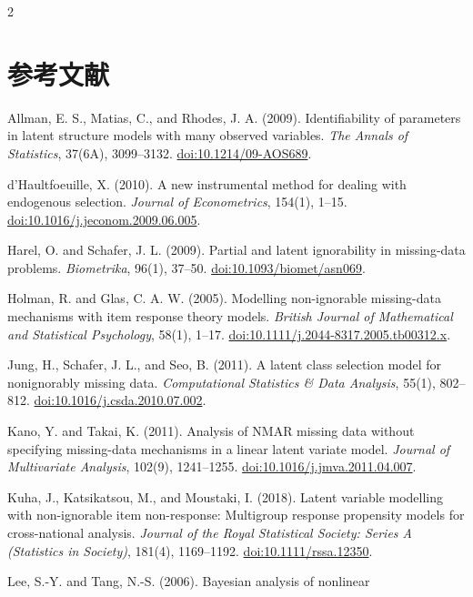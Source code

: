 \documentclass[a4paper,10pt]{article}
\begin{document}
\begin{multicols}{2}
\section*{参考文献}
\begin{enumerate}[label={[\arabic*]},leftmargin=7mm,itemsep=0.35em,topsep=0.2em,
  parsep=0pt,partopsep=0pt]
\item Allman, E. S., Matias, C., and Rhodes, J. A. (2009). Identifiability of
parameters in latent structure models with many observed variables.
\textit{The Annals of Statistics}, 37(6A), 3099--3132.
\href{https://doi.org/10.1214/09-AOS689}{doi:10.1214/09-AOS689}.
\item d'Haultfoeuille, X. (2010). A new instrumental method for dealing with
endogenous selection. \textit{Journal of Econometrics}, 154(1), 1--15.
\href{https://doi.org/10.1016/j.jeconom.2009.06.005}{doi:10.1016/j.jeconom.2009.06.005}.
\item Harel, O. and Schafer, J. L. (2009). Partial and latent ignorability in
missing-data problems. \textit{Biometrika}, 96(1), 37--50.
\href{https://doi.org/10.1093/biomet/asn069}{doi:10.1093/biomet/asn069}.
\item Holman, R. and Glas, C. A. W. (2005). Modelling non-ignorable
missing-data mechanisms with item response theory models. \textit{British
Journal of Mathematical and Statistical Psychology}, 58(1), 1--17.
\href{https://doi.org/10.1111/j.2044-8317.2005.tb00312.x}{doi:10.1111/j.2044-8317.2005.tb00312.x}.
\item Jung, H., Schafer, J. L., and Seo, B. (2011). A latent class selection
model for nonignorably missing data. \textit{Computational Statistics \& Data
Analysis}, 55(1), 802--812.
\href{https://doi.org/10.1016/j.csda.2010.07.002}{doi:10.1016/j.csda.2010.07.002}.
\item Kano, Y. and Takai, K. (2011). Analysis of NMAR missing data without
specifying missing-data mechanisms in a linear latent variate model.
\textit{Journal of Multivariate Analysis}, 102(9), 1241--1255.
\href{https://doi.org/10.1016/j.jmva.2011.04.007}{doi:10.1016/j.jmva.2011.04.007}.
\item Kuha, J., Katsikatsou, M., and Moustaki, I. (2018). Latent variable
modelling with non-ignorable item non-response: Multigroup response propensity
models for cross-national analysis. \textit{Journal of the Royal Statistical
Society: Series A (Statistics in Society)}, 181(4), 1169--1192.
\href{https://doi.org/10.1111/rssa.12350}{doi:10.1111/rssa.12350}.
\item Lee, S.-Y. and Tang, N.-S. (2006). Bayesian analysis of nonlinear

\end{enumerate}
\end{multicols}
\end{document}
